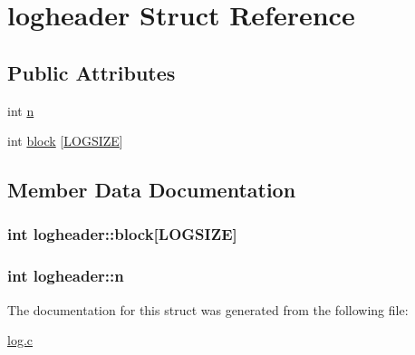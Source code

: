 \hypertarget{structlogheader}{}\section{logheader Struct Reference}
\label{structlogheader}
\subsection*{Public Attributes}
\begin{DoxyCompactItemize}
\item 
int \hyperlink{structlogheader_a50b276b70d44ae77497ef1d71d182875}{n}
\item 
int \hyperlink{structlogheader_a020db7fe04c7ce6b8f4aee2092576c2c}{block} \mbox{[}\hyperlink{param_8h_acc7694167c7840a913939a1b90808b4c}{L\+O\+G\+S\+I\+ZE}\mbox{]}
\end{DoxyCompactItemize}


\subsection{Member Data Documentation}
\subsubsection[{\texorpdfstring{block}{block}}]{\setlength{\rightskip}{0pt plus 5cm}int logheader\+::block\mbox{[}{\bf L\+O\+G\+S\+I\+ZE}\mbox{]}}\hypertarget{structlogheader_a020db7fe04c7ce6b8f4aee2092576c2c}{}\label{structlogheader_a020db7fe04c7ce6b8f4aee2092576c2c}
\subsubsection[{\texorpdfstring{n}{n}}]{\setlength{\rightskip}{0pt plus 5cm}int logheader\+::n}\hypertarget{structlogheader_a50b276b70d44ae77497ef1d71d182875}{}\label{structlogheader_a50b276b70d44ae77497ef1d71d182875}


The documentation for this struct was generated from the following file\+:\begin{DoxyCompactItemize}
\item 
\hyperlink{log_8c}{log.\+c}\end{DoxyCompactItemize}
